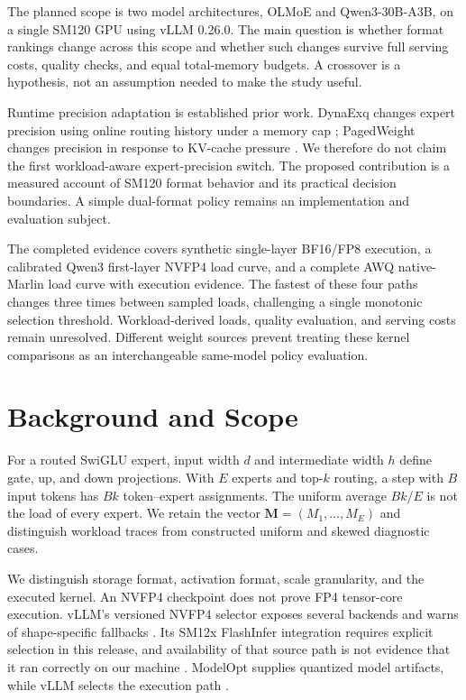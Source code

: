 \documentclass[10pt,twocolumn]{article}
\begin{document}
The planned scope is two model architectures, OLMoE and Qwen3-30B-A3B, on a
single SM120 GPU using vLLM 0.26.0. The main question is whether format rankings
change across this scope and whether such changes survive full serving costs,
quality checks, and equal total-memory budgets. A crossover is a hypothesis,
not an assumption needed to make the study useful.

Runtime precision adaptation is established prior work. DynaExq changes
expert precision using online routing history under a memory cap
\citep{dynaexq}; PagedWeight changes precision in response to KV-cache pressure
\citep{pagedweight}. We therefore do not claim the first workload-aware
expert-precision switch. The proposed contribution is a measured account of
SM120 format behavior and its practical decision boundaries. A simple
dual-format policy remains an implementation and evaluation subject.

The completed evidence covers synthetic single-layer BF16/FP8 execution,
a calibrated Qwen3 first-layer NVFP4 load curve, and a complete AWQ
native-Marlin load curve with execution evidence. The fastest of these four
paths changes three times between sampled loads, challenging a single
monotonic selection threshold. Workload-derived loads, quality evaluation, and serving costs
remain unresolved. Different weight sources prevent treating these kernel
comparisons as an interchangeable same-model policy evaluation.

\section{Background and Scope}
For a routed SwiGLU expert, input width $d$ and intermediate width $h$ define
gate, up, and down projections. With $E$ experts and top-$k$ routing, a step
with $B$ input tokens has $Bk$ token--expert assignments. The uniform average
$Bk/E$ is not the load of every expert. We retain the vector
$\mathbf{M}=(M_1,\ldots,M_E)$ and distinguish workload traces from constructed
uniform and skewed diagnostic cases.

We distinguish storage format, activation format, scale granularity, and
the executed kernel. An NVFP4 checkpoint does not prove FP4 tensor-core
execution. vLLM's versioned NVFP4 selector exposes several backends and warns
of shape-specific fallbacks \citep{nvfp4oracle}. Its SM12x FlashInfer integration
requires explicit selection in this release, and availability of that source
path is not evidence that it ran correctly on our machine \citep{b12x}.
ModelOpt supplies quantized model artifacts, while vLLM selects the execution
path \citep{modelopt,vllmmodelopt}.
\end{document}
